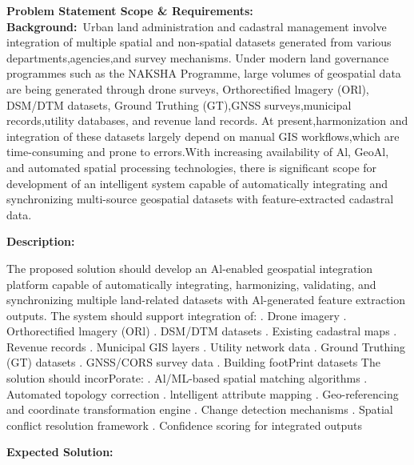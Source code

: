 \documentclass[10pt,a4paper]{article}
\begin{document}
\begin{tcolorbox}[pscard, title={"\textbf{SIH26013} \quad $\vert$ \quad Automated lntegration and lntelligent Harmonization of Multi-source Geospat...}]
\textbf{\color{sihnavy}Problem Statement Scope \& Requirements:}\\[0.15cm]
\vspace{0.18cm}\noindent\textbf{\color{sihnavy}Background:}~\small Urban land administration and cadastral management involve integration of multiple spatial and non-spatial datasets generated from various departments,agencies,and survey mechanisms. Under modern land governance programmes such as the NAKSHA Programme, large volumes of geospatial data are being generated through drone surveys, Orthorectified lmagery (ORl), DSM/DTM datasets, Ground Truthing (GT),GNSS surveys,municipal records,utility databases, and revenue land records. At present,harmonization and integration of these datasets largely depend on manual GIS workflows,which are time-consuming and prone to errors.With increasing availability of Al, GeoAl, and automated spatial processing technologies, there is significant scope for development of an intelligent system capable of automatically integrating and synchronizing multi-source geospatial datasets with feature-extracted cadastral data.\par\vspace{0.06cm}
\vspace{0.18cm}\noindent\textbf{\color{sihnavy}Description:}\par\vspace{0.06cm}
\noindent\small The proposed solution should develop an Al-enabled geospatial integration platform capable of automatically integrating, harmonizing, validating, and synchronizing multiple land-related datasets with Al-generated feature extraction outputs. The system should support integration of: . Drone imagery . Orthorectified lmagery (ORl) . DSM/DTM datasets . Existing cadastral maps . Revenue records . Municipal GIS layers . Utility network data . Ground Truthing (GT) datasets . GNSS/CORS survey data . Building footPrint datasets The solution should incorPorate: . Al/ML-based spatial matching algorithms . Automated topology correction . lntelligent attribute mapping . Geo-referencing and coordinate transformation engine . Change detection mechanisms . Spatial conflict resolution framework . Confidence scoring for integrated outputs\par\vspace{0.06cm}
\vspace{0.18cm}\noindent\textbf{\color{sihnavy}Expected Solution:}\par\vspace{0.06cm}

\end{tcolorbox}
\end{document}
